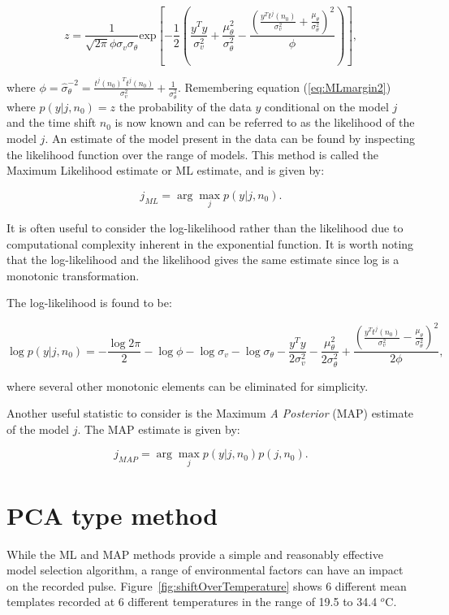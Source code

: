 \begin{equation}\label{eq:MLprod7}
z = \frac{1}{\sqrt{2 \pi}\phi \sigma_v \sigma_\theta}\textrm{exp}\left[-\frac{1}{2}\left(\frac{y^T y}{\sigma^2_v}+\frac{\mu_\theta^2}{\sigma_\theta^2} - \frac{\left(\frac{y^T t^j(n_0)}{\sigma_v^2}+\frac{\mu_\theta}{\sigma_\theta^2}\right)^2}{\phi}\right)\right],
\end{equation}

where $\phi = \hat{\sigma}^{-2}_\theta = \frac{t^j(n_0)^Tt^j(n_0)}{\sigma_v^2} + \frac{1}{\sigma_\theta^2}$. Remembering equation (\ref{eq:MLmargin2}) where $p(y|j,n_0) = z$ the probability of the data $y$ conditional on the model $j$ and the time shift $n_0$ is now known and can be referred to as the likelihood of the model $j$. An estimate of the model present in the data can be found by inspecting the likelihood function over the range of models. This method is called the Maximum Likelihood estimate or ML estimate, and is given by:

\begin{equation}\label{eq:MLdefinition}
j_{ML} = \arg\max_j p(y|j,n_0).
\end{equation}

It is often useful to consider the log-likelihood rather than the likelihood due to computational complexity inherent in the exponential function. It is worth noting that the log-likelihood and the likelihood gives the same estimate since log is a monotonic transformation.

The log-likelihood is found to be:

\begin{equation}\label{eq:MLloglikelihood}
\log{p(y|j,n_0)} = -\frac{\log{2\pi}}{2} - \log{\phi} - \log{\sigma_v} -\log{\sigma_\theta} - \frac{y^T y}{2\sigma_v^2} -\frac{\mu^2_\theta}{2\sigma^2_\theta} + \frac{\left(\frac{y^T t^j(n_0)}{\sigma^2_v}-\frac{\mu_\theta}{\sigma^2_\theta}\right)^2}{2\phi},
\end{equation}

where several other monotonic elements can be eliminated for simplicity.

Another useful statistic to consider is the Maximum \emph{A Posterior} (MAP) estimate of the model $j$. The MAP estimate is given by:

\begin{equation}\label{eq:MAPdefinition}
j_{MAP} = \arg\max_j p(y|j,n_0)p(j,n_0).
\end{equation}


\section{PCA type method}
While the ML and MAP methods provide a simple and reasonably effective model selection algorithm, a range of environmental factors can have an impact on the recorded pulse. Figure~\ref{fig:shiftOverTemperature} shows 6 different mean templates recorded at 6 different temperatures in the range of 19.5 to 34.4 $^o$C.

